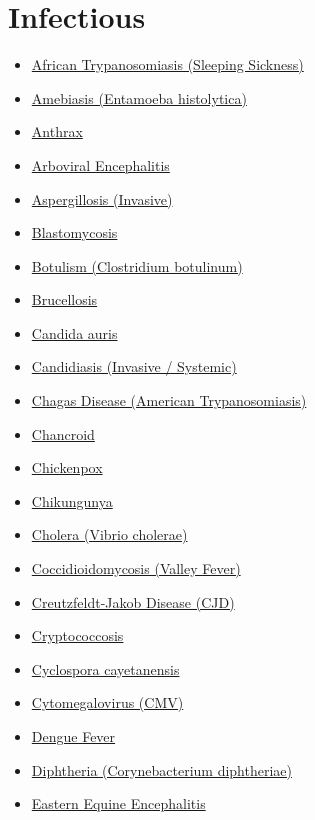 \section*{Infectious}
\label{sec:organ_infectious}
\begin{itemize}[noitemsep]
  \item \hyperlink{sec:African Trypanosomiasis}{African Trypanosomiasis (Sleeping Sickness)}
  \item \hyperlink{sec:Amebiasis}{Amebiasis (Entamoeba histolytica)}
  \item \hyperlink{sec:Anthrax}{Anthrax}
  \item \hyperlink{sec:Arboviral Encephalitis}{Arboviral Encephalitis}
  \item \hyperlink{sec:Aspergillosis Invasive}{Aspergillosis (Invasive)}
  \item \hyperlink{sec:Blastomycosis}{Blastomycosis}
  \item \hyperlink{sec:Botulism}{Botulism (Clostridium botulinum)}
  \item \hyperlink{sec:Brucellosis}{Brucellosis}
  \item \hyperlink{sec:Candida auris}{Candida auris}
  \item \hyperlink{sec:Candidiasis Systemic}{Candidiasis (Invasive / Systemic)}
  \item \hyperlink{sec:Chagas Disease}{Chagas Disease (American Trypanosomiasis)}
  \item \hyperlink{sec:Chancroid}{Chancroid}
  \item \hyperlink{sec:Chickenpox}{Chickenpox}
  \item \hyperlink{sec:Chikungunya}{Chikungunya}
  \item \hyperlink{sec:Cholera}{Cholera (Vibrio cholerae)}
  \item \hyperlink{sec:Coccidioidomycosis}{Coccidioidomycosis (Valley Fever)}
  \item \hyperlink{sec:Creutzfeldt-Jakob Disease}{Creutzfeldt-Jakob Disease (CJD)}
  \item \hyperlink{sec:Cryptococcosis}{Cryptococcosis}
  \item \hyperlink{sec:Cyclospora}{Cyclospora cayetanensis}
  \item \hyperlink{sec:Cytomegalovirus}{Cytomegalovirus (CMV)}
  \item \hyperlink{sec:Dengue Fever}{Dengue Fever}
  \item \hyperlink{sec:Diphtheria}{Diphtheria (Corynebacterium diphtheriae)}
  \item \hyperlink{sec:Eastern Equine Encephalitis}{Eastern Equine Encephalitis}

\end{itemize}

